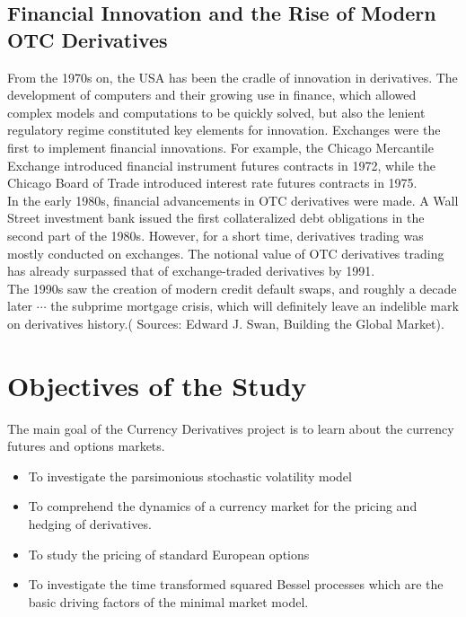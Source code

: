 \documentclass[a4 paper, 12pt]{report}
\theoremstyle{plain}
\begin{document}
\subsection{Financial Innovation and the Rise of Modern OTC Derivatives}
\noindent
\par From the 1970s on, the USA has been the cradle of innovation in derivatives. The
development of computers and their growing use in finance, which allowed complex
models and computations to be quickly solved, but also the lenient regulatory regime
constituted key elements for innovation. Exchanges were the first to implement financial
innovations. For example, the Chicago Mercantile Exchange introduced financial
instrument futures contracts in 1972, while the Chicago Board of Trade introduced
interest rate futures contracts in 1975.\\
In the early 1980s, financial advancements in OTC derivatives were made. A Wall Street
investment bank issued the first collateralized debt obligations in the second part of the
1980s. However, for a short time, derivatives trading was mostly conducted on
exchanges. The notional value of OTC derivatives trading has already surpassed that of
exchange-traded derivatives by 1991.\\
The 1990s saw the creation of modern credit default swaps, and roughly a decade later $\cdots$
the subprime mortgage crisis, which will definitely leave an indelible mark on derivatives
history.( Sources: Edward J. Swan, Building the Global Market).
\section{Objectives of the Study}
\noindent 
\par The main goal of the Currency Derivatives project is to learn about the currency futures
and options markets.
\begin{itemize}
\item To investigate the parsimonious stochastic volatility model

\item To comprehend the dynamics of a currency market for the pricing and hedging of
derivatives.

\item To study the pricing of standard European options

\item To investigate the time transformed squared Bessel processes which are the basic
driving factors of the minimal market model.
\end{itemize}
\end{document}
